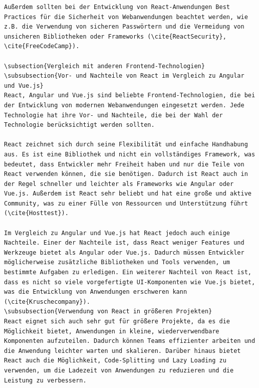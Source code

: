 \begin{lstlisting}
Außerdem sollten bei der Entwicklung von React-Anwendungen Best Practices für die Sicherheit von Webanwendungen beachtet werden, wie z.B. die Verwendung von sicheren Passwörtern und die Vermeidung von unsicheren Bibliotheken oder Frameworks (\cite{ReactSecurity}, \cite{FreeCodeCamp}).

\subsection{Vergleich mit anderen Frontend-Technologien}
\subsubsection{Vor- und Nachteile von React im Vergleich zu Angular und Vue.js}
React, Angular und Vue.js sind beliebte Frontend-Technologien, die bei der Entwicklung von modernen Webanwendungen eingesetzt werden. Jede Technologie hat ihre Vor- und Nachteile, die bei der Wahl der Technologie berücksichtigt werden sollten.

React zeichnet sich durch seine Flexibilität und einfache Handhabung aus. Es ist eine Bibliothek und nicht ein vollständiges Framework, was bedeutet, dass Entwickler mehr Freiheit haben und nur die Teile von React verwenden können, die sie benötigen. Dadurch ist React auch in der Regel schneller und leichter als Frameworks wie Angular oder Vue.js. Außerdem ist React sehr beliebt und hat eine große und aktive Community, was zu einer Fülle von Ressourcen und Unterstützung führt (\cite{Hosttest}).

Im Vergleich zu Angular und Vue.js hat React jedoch auch einige Nachteile. Einer der Nachteile ist, dass React weniger Features und Werkzeuge bietet als Angular oder Vue.js. Dadurch müssen Entwickler möglicherweise zusätzliche Bibliotheken und Tools verwenden, um bestimmte Aufgaben zu erledigen. Ein weiterer Nachteil von React ist, dass es nicht so viele vorgefertigte UI-Komponenten wie Vue.js bietet, was die Entwicklung von Anwendungen erschweren kann (\cite{Kruschecompany}).
\subsubsection{Verwendung von React in größeren Projekten}
React eignet sich auch sehr gut für größere Projekte, da es die Möglichkeit bietet, Anwendungen in kleine, wiederverwendbare Komponenten aufzuteilen. Dadurch können Teams effizienter arbeiten und die Anwendung leichter warten und skalieren. Darüber hinaus bietet React auch die Möglichkeit, Code-Splitting und Lazy Loading zu verwenden, um die Ladezeit von Anwendungen zu reduzieren und die Leistung zu verbessern.


\end{lstlisting}
